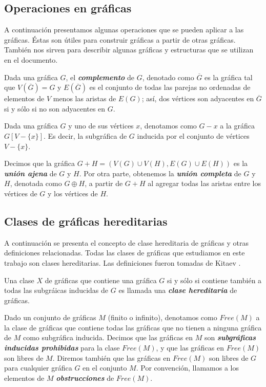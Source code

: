 \subsection{Operaciones en gráficas}

A continuación presentamos algunas operaciones que se pueden aplicar a las gráficas. Éstas son útiles para construir gráficas a partir de otras gráficas. También nos sirven para describir algunas gráficas y estructuras que se utilizan en el documento. 

Dada una gráfica $G$, el \textbf{\emph{complemento}} de $G$, denotado como $\overline{G}$ es la gráfica tal que $V(\overline{G}) = G$ y $E(\overline{G})$ es el conjunto de todas las parejas no ordenadas de elementos de $V$ menos las aristas de $E(G)$; así, dos vértices son adyacentes en $\overline{G}$ si y sólo si no son adyacentes en $G$.

 Dada una gráfica $G$ y uno de sus vértices $x$, denotamos como $G - x $ a la gráfica $G[V-\{x\}]$. Es decir, la subgráfica de $G$ inducida por el conjunto de vértices $V-\{x\}$. 

Decimos que la gráfica $G + H = (V(G)\cup V(H), E(G)\cup E(H))$ es la \textbf{\emph{unión ajena}} de $G$ y $H$. Por otra parte, obtenemos la \textbf{\emph{unión completa}} de $G$ y $H$, denotada como $G \oplus H$, a partir de $G + H$ al agregar todas las aristas entre los vértices de $G$ y los vértices de $H$. 

\subsection{Clases de gráficas hereditarias}

A continuación se presenta el concepto de clase hereditaria de gráficas y otras definiciones relacionadas. Todas las clases de gráficas que estudiamos en este trabajo son clases hereditarias.  Las definiciones fueron tomadas de Kitaev \cite{Kitaev}.

Una clase $X$ de gráficas que contiene una gráfica $G$ si y sólo si contiene también a todas las subgráicas inducidas de $G$ es llamada una \textbf{\emph{clase hereditaria}} de gráficas.

Dado un conjunto de gráficas $M$ (finito o infinito), denotamos como $Free(M)$ a la clase de gráficas que contiene todas las gráficas que no tienen a ninguna gráfica de $M$ como subgráfica inducida. Decimos que las gráficas en $M$ son \textbf{\emph{subgráficas inducidas prohibidas}} para la clase $Free(M)$, y que las gráficas en $Free(M)$ son libres de $M$. Diremos también que las gráficas en $Free(M)$ son libres de $G$ para cualquier gráfica $G$ en el conjunto $M$. Por convención, llamamos a los elementos de $M$ \textbf{\emph{obstrucciones}} de $Free(M)$.

